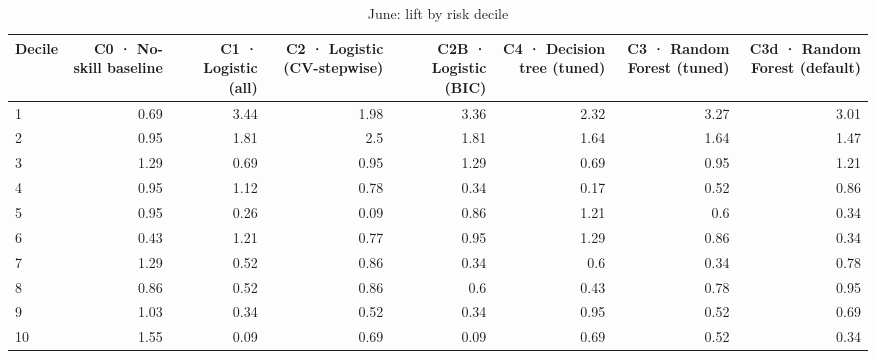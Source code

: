 \begin{table}[htbp]
\centering
\small
\caption{June: lift by risk decile}
\begin{tabular}{lrrrrrrr}
\toprule
Decile & C0 · No-skill baseline & C1 · Logistic (all) & C2 · Logistic (CV-stepwise) & C2B · Logistic (BIC) & C4 · Decision tree (tuned) & C3 · Random Forest (tuned) & C3d · Random Forest (default) \\
\midrule
1 & 0.69 & 3.44 & 1.98 & 3.36 & 2.32 & 3.27 & 3.01 \\
2 & 0.95 & 1.81 & 2.5 & 1.81 & 1.64 & 1.64 & 1.47 \\
3 & 1.29 & 0.69 & 0.95 & 1.29 & 0.69 & 0.95 & 1.21 \\
4 & 0.95 & 1.12 & 0.78 & 0.34 & 0.17 & 0.52 & 0.86 \\
5 & 0.95 & 0.26 & 0.09 & 0.86 & 1.21 & 0.6 & 0.34 \\
6 & 0.43 & 1.21 & 0.77 & 0.95 & 1.29 & 0.86 & 0.34 \\
7 & 1.29 & 0.52 & 0.86 & 0.34 & 0.6 & 0.34 & 0.78 \\
8 & 0.86 & 0.52 & 0.86 & 0.6 & 0.43 & 0.78 & 0.95 \\
9 & 1.03 & 0.34 & 0.52 & 0.34 & 0.95 & 0.52 & 0.69 \\
10 & 1.55 & 0.09 & 0.69 & 0.09 & 0.69 & 0.52 & 0.34 \\
\bottomrule
\end{tabular}
\par\smallskip\begin{minipage}{\linewidth}\footnotesize \end{minipage}
\end{table}

